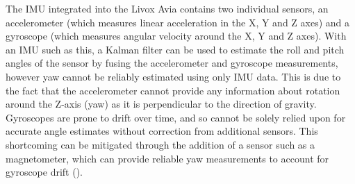 The \ac{IMU} integrated into the Livox Avia contains two individual sensors, an accelerometer (which measures linear acceleration in the X, Y and Z axes) and a gyroscope (which measures angular velocity around the X, Y and Z axes). With an \ac{IMU} such as this, a Kalman filter can be used to estimate the roll and pitch angles of the sensor by fusing the accelerometer and gyroscope measurements, however yaw cannot be reliably estimated using only \ac{IMU} data. This is due to the fact that the accelerometer cannot provide any information about rotation around the Z-axis (yaw) as it is perpendicular to the direction of gravity. Gyroscopes are prone to drift over time, and so cannot be solely relied upon for accurate angle estimates without correction from additional sensors. This shortcoming can be mitigated through the addition of a sensor such as a magnetometer, which can provide reliable yaw measurements to account for gyroscope drift (\cite{songEstimatingRelativeAngles2022}).


